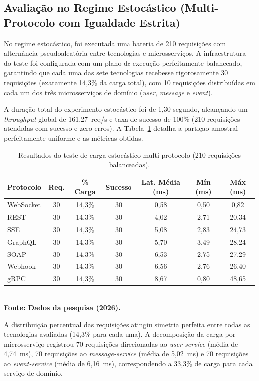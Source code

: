 \documentclass[a4paper,12pt]{article}
\begin{document}
\subsection{Avaliação no Regime Estocástico (Multi-Protocolo com Igualdade Estrita)}

No regime estocástico, foi executada uma bateria de 210 requisições com alternância pseudoaleatória entre tecnologias e microsserviços. A infraestrutura do teste foi configurada com um plano de execução perfeitamente balanceado, garantindo que cada uma das sete tecnologias recebesse rigorosamente 30 requisições (exatamente 14,3\% da carga total), com 10 requisições distribuídas em cada um dos três microsserviços de domínio (\textit{user}, \textit{message} e \textit{event}).

A duração total do experimento estocástico foi de 1,30 segundo, alcançando um \textit{throughput} global de 161,27~req/s e taxa de sucesso de 100\% (210 requisições atendidas com sucesso e zero erros). A Tabela~\ref{tab:resultados_estocasticos} detalha a partição amostral perfeitamente uniforme e as métricas obtidas.

\begin{table}[H]
\centering
\small
\caption{Resultados do teste de carga estocástico multi-protocolo (210 requisições balanceadas).}
\label{tab:resultados_estocasticos}
\begin{tabular}{|l|c|c|c|c|c|c|}
\hline
\textbf{Protocolo} & \textbf{Req.} & \textbf{\% Carga} & \textbf{Sucesso} & \textbf{Lat. Média (ms)} & \textbf{Mín (ms)} & \textbf{Máx (ms)} \\ \hline
WebSocket & 30 & 14,3\% & 30 & 0,58 & 0,50 & 0,82 \\ \hline
REST & 30 & 14,3\% & 30 & 4,02 & 2,71 & 20,34 \\ \hline
SSE & 30 & 14,3\% & 30 & 5,08 & 2,83 & 24,73 \\ \hline
GraphQL & 30 & 14,3\% & 30 & 5,70 & 3,49 & 28,24 \\ \hline
SOAP & 30 & 14,3\% & 30 & 6,53 & 2,75 & 27,29 \\ \hline
Webhook & 30 & 14,3\% & 30 & 6,56 & 2,76 & 26,40 \\ \hline
gRPC & 30 & 14,3\% & 30 & 8,67 & 0,80 & 48,65 \\ \hline
\end{tabular}
{\footnotesize\\ \textbf{Fonte: Dados da pesquisa (2026).}}
\end{table}

A distribuição percentual das requisições atingiu simetria perfeita entre todas as tecnologias avaliadas (14,3\% para cada uma). A decomposição da carga por microsserviço registrou 70 requisições direcionadas ao \textit{user-service} (média de 4,74~ms), 70 requisições ao \textit{message-service} (média de 5,02~ms) e 70 requisições ao \textit{event-service} (média de 6,16~ms), correspondendo a 33,3\% de carga para cada serviço de domínio.
\end{document}
